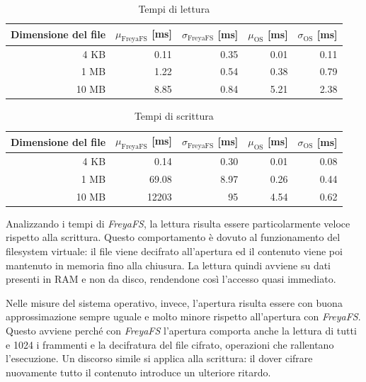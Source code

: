 \documentclass[a4paper,12pt,twoside,openright]{report}
\begin{document}
  \begin{table}[h!]
    \centering
    \begin{tabular}{|r||r|r||r|r|} 
      \hline
      Dimensione del file & $\mu_\text{FreyaFS}$ [ms] & $\sigma_\text{FreyaFS}$ [ms] & $\mu_\text{OS}$ [ms] & $\sigma_\text{OS}$ [ms] \\ [0.5ex]
      \hline\hline
      4 KB & 0.11 & 0.35   & 0.01 & 0.11 \\
      \hline
      1 MB & 1.22 & 0.54   & 0.38 & 0.79 \\
      \hline
      10 MB & 8.85 & 0.84  & 5.21 & 2.38 \\
      \hline
    \end{tabular}
    \caption{Tempi di lettura}
    \label{table:t-read}
  \end{table}

  \begin{table}[h!]
    \centering
    \begin{tabular}{|r||r|r||r|r|} 
      \hline
      Dimensione del file & $\mu_\text{FreyaFS}$ [ms] & $\sigma_\text{FreyaFS}$ [ms] & $\mu_\text{OS}$ [ms] & $\sigma_\text{OS}$ [ms] \\ [0.5ex]
      \hline\hline
      4 KB & 0.14 & 0.30    & 0.01 & 0.08 \\
      \hline
      1 MB & 69.08 & 8.97   & 0.26 & 0.44 \\
      \hline
      10 MB & 12203 & 95    & 4.54 & 0.62 \\
      \hline
    \end{tabular}
    \caption{Tempi di scrittura}
    \label{table:t-write}
  \end{table}

  Analizzando i tempi di \textit{FreyaFS}, la lettura risulta essere particolarmente veloce rispetto alla scrittura.
  Questo comportamento è dovuto al funzionamento del \mbox{filesystem} virtuale: il file viene decifrato all'apertura ed il contenuto
  viene poi mantenuto in memoria fino alla chiusura. La lettura quindi avviene su dati presenti in RAM e non da disco,
  rendendone così l'accesso quasi immediato.

  Nelle misure del sistema operativo, invece, l'apertura risulta essere con buona approssimazione sempre uguale
  e molto minore rispetto all'apertura con \textit{FreyaFS}.
  Questo avviene perché con \textit{FreyaFS} l'apertura comporta anche
  la lettura di tutti e 1024 i frammenti e la decifratura del file cifrato, operazioni
  che rallentano l'esecuzione.
  Un discorso simile si applica alla scrittura: il dover cifrare nuovamente tutto il contenuto
  introduce un ulteriore ritardo.
\end{document}
